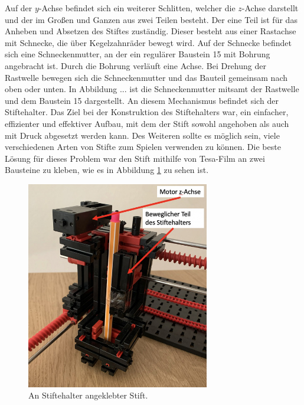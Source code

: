 \documentclass[conference,compsoc,final,a4paper]{IEEEtran}
\begin{document}
Auf der $y$-Achse befindet sich ein weiterer Schlitten, welcher die $z$-Achse darstellt und der im Großen und Ganzen aus zwei Teilen besteht. 
Der eine Teil ist für das Anheben und Absetzen des Stiftes zuständig. Dieser besteht aus einer Rastachse mit Schnecke, die über
Kegelzahnräder bewegt wird. Auf der Schnecke befindet sich eine Schneckenmutter, an der ein regulärer Baustein 15 mit Bohrung angebracht ist. Durch die Bohrung verläuft eine Achse. Bei Drehung der Rastwelle bewegen sich die Schneckenmutter und das Bauteil gemeinsam nach oben oder unten. In Abbildung ... ist die Schneckenmutter mitsamt der Rastwelle und dem Baustein 15 dargestellt.
An diesem Mechanismus befindet sich der Stiftehalter. Das Ziel bei der Konstruktion des Stiftehalters war, ein einfacher, effizienter und
effektiver Aufbau, mit dem der Stift sowohl angehoben als auch mit Druck abgesetzt werden kann. Des Weiteren sollte es möglich sein, viele
verschiedenen Arten von Stifte zum Spielen verwenden zu können. Die beste Lösung für dieses Problem war den Stift mithilfe von Tesa-Film
an zwei Bausteine zu kleben, wie es in Abbildung \ref{fig:AufbauzAchse1} zu sehen ist. 

\begin{figure}[h]
\centering
\includegraphics[width=8cm]{../images/zAchse1.png}
\caption{An Stiftehalter angeklebter Stift. }
\label{fig:AufbauzAchse1}
\end{figure}
\end{document}
